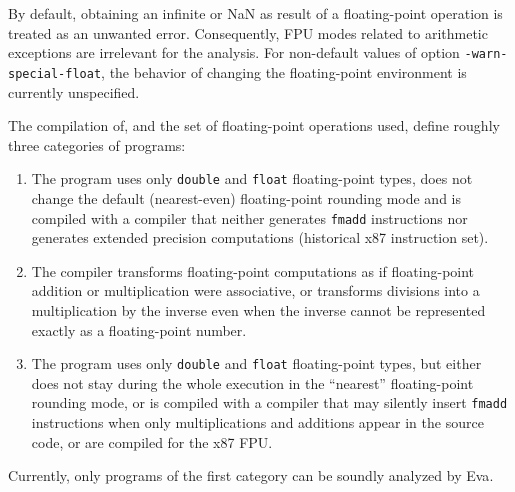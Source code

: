 \documentclass[web]{frama-c-book}
\newcommand{\Eva}{\textsf{Eva}}
\begin{document}
By default, obtaining an
infinite or NaN as result of a floating-point operation is treated
as an unwanted error. Consequently, FPU modes related to arithmetic
exceptions are irrelevant for the analysis.
For non-default values of option \texttt{-warn-special-float}, the
behavior of changing the floating-point environment is currently unspecified.


The compilation of, and the set of floating-point operations used, define
roughly three categories of programs:
\begin{enumerate}

\item The program uses only
\lstinline|double| and \lstinline|float| floating-point types,
does not change the default (nearest-even) floating-point rounding
mode and is compiled with a compiler that neither generates
\lstinline|fmadd| instructions nor generates extended precision computations
(historical x87 instruction set).

\item The compiler transforms floating-point computations
as if floating-point addition or multiplication were associative,
or transforms divisions into a multiplication by the inverse even when
the inverse cannot be represented exactly as a floating-point number.

\item The program uses only
\lstinline|double| and \lstinline|float| floating-point types,
but either does not stay during the whole
execution in the ``nearest'' floating-point rounding mode, or is
compiled with a compiler that may silently insert \lstinline|fmadd|
instructions when only multiplications and additions appear in the
source code, or are compiled for the x87 FPU. %
\end{enumerate}
%
Currently, only programs of the first category can be soundly analyzed by
\Eva{}.

\end{document}
